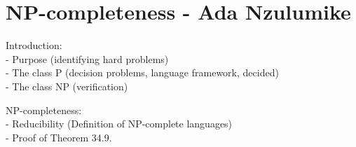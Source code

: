 \section*{NP-completeness - Ada Nzulumike}

Introduction:
\\
- Purpose (identifying hard problems)
\\
- The class P (decision problems, language framework, decided)
\\
- The class NP (verification)

NP-completeness:
\\
- Reducibility (Definition of NP-complete languages)
\\
- Proof of Theorem 34.9.